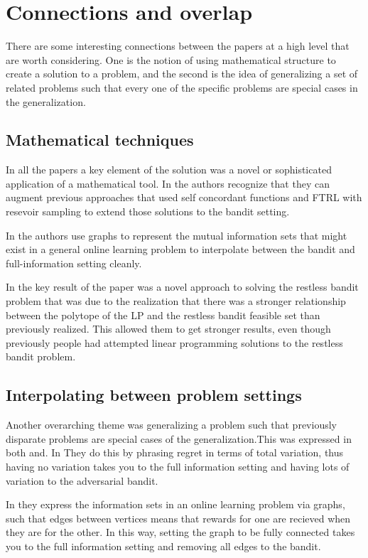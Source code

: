\section{Connections and overlap}
There are some interesting connections between the papers at a high level that are worth considering. One is the notion of using mathematical structure to create a solution to a
problem, and the second is the idea of generalizing a set of related problems such that
every one of the specific problems are special cases in the generalization.
\subsection{Mathematical techniques}
In all the papers a key element of the solution was a novel or sophisticated application of a mathematical tool. In \citep{hazan} the authors recognize that they can augment previous approaches that used self concordant functions and FTRL with resevoir sampling to extend those solutions to the bandit setting.

In \citep{alon} the authors use graphs to represent the mutual information sets that might exist in a general online learning problem to interpolate between the bandit and full-information setting cleanly.

In \citep{bertsimas} the key result of the paper was a novel approach to solving the restless bandit problem that was due to the realization that there was a stronger relationship between the polytope of the LP and the restless bandit feasible set than previously realized. This allowed them to get stronger results, even though previously people had attempted linear programming solutions to the restless bandit problem.
\subsection{Interpolating between problem settings}
Another overarching theme was generalizing a problem  such that previously disparate problems are special cases of the generalization.This was expressed in both \citep{hazan} and\citep{alon}.  In \citep{hazan}They do this by phrasing regret in terms of total variation, thus having no variation takes you to the full information setting and having lots of variation to the adversarial bandit. 

In \citep{alon} they express the information sets in an online learning problem via graphs, such that edges between vertices means that rewards for one are recieved when they are for the other. In this way, setting the graph to be fully connected takes you to the full information setting and removing all edges to the bandit.



